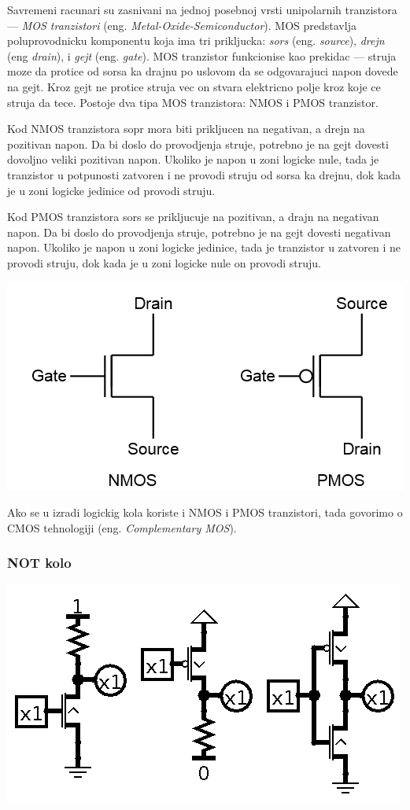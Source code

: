\documentclass[12p,a4paper]{article}
\begin{document}
\begin{multicols}{2}
    Savremeni racunari su zasnivani na jednoj posebnoj vrsti unipolarnih
    tranzistora --- \emph{MOS tranzistori} 
    (eng. \emph{Metal-Oxide-Semiconductor}).
    MOS predstavlja poluprovodnicku komponentu koja ima tri prikljucka:
    \emph{sors} (eng. \emph{source}), \emph{drejn} (eng \emph{drain}), i 
    \emph{gejt} (eng. \emph{gate}).
    MOS tranzistor funkcionise kao prekidac --- struja moze da protice od 
    sorsa ka drajnu po uslovom da se odgovarajuci napon dovede na gejt.
    Kroz gejt ne protice struja vec on stvara elektricno polje kroz koje
    ce struja da tece.
    Postoje dva tipa MOS tranzistora: NMOS i PMOS tranzistor.

    Kod NMOS tranzistora sopr mora biti prikljucen na negativan, a drejn na 
    pozitivan napon.
    Da bi doslo do provodjenja struje, potrebno je na gejt dovesti dovoljno 
    veliki pozitivan napon.
    Ukoliko je napon u zoni logicke nule, tada je tranzistor u potpunosti 
    zatvoren i ne provodi struju od sorsa ka drejnu, dok kada je u zoni 
    logicke jedinice od provodi struju.

    Kod PMOS tranzistora sors se prikljucuje na pozitivan, a drajn na negativan
    napon. 
    Da bi doslo do provodjenja struje, potrebno je na gejt dovesti negativan 
    napon.
    Ukoliko je napon u zoni logicke jedinice, tada je tranzistor u zatvoren i
    ne provodi struju, dok kada je u zoni logicke nule on provodi struju.

    \includegraphics[width=0.8\columnwidth]{Figures/mos.png}

    Ako se u izradi logickig kola koriste i NMOS i PMOS tranzistori, tada
    govorimo o CMOS tehnologiji (eng. \emph{Complementary MOS}).

    \subsubsection{NOT kolo}

    \includegraphics[width=0.7\columnwidth]{Figures/mos_not.png}


\end{multicols}
\end{document}
